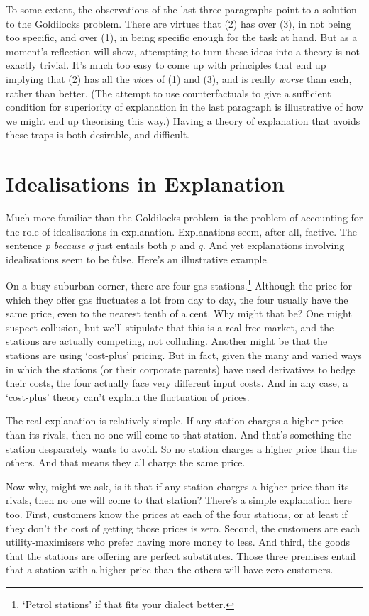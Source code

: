 To some extent, the observations of the last three paragraphs point to a solution to the Goldilocks problem. There are virtues that (2) has over (3), in not being too specific, and over (1), in being specific enough for the task at hand. But as a moment's reflection will show, attempting to turn these ideas into a theory is not exactly trivial. It's much too easy to come up with principles that end up implying that (2) has all the \textit{vices} of (1) and (3), and is really \textit{worse} than each, rather than better. (The attempt to use counterfactuals to give a sufficient condition for superiority of explanation in the last paragraph is illustrative of how we might end up theorising this way.) Having a theory of explanation that avoids these traps is both desirable, and difficult.

\section{Idealisations in Explanation}

Much more familiar than the Goldilocks problem\ is the problem of accounting for the role of idealisations in explanation. Explanations seem, after all, factive. The sentence \textit{p because q} just entails both $p$ and $q$. And yet explanations involving idealisations seem to be false. Here's an illustrative example.

On a busy suburban corner, there are four gas stations.\footnote{`Petrol stations' if that fits your dialect better.} Although the price for which they offer gas fluctuates a lot from day to day, the four usually have the same price, even to the nearest tenth of a cent. Why might that be? One might suspect collusion, but we'll stipulate that this is a real free market, and the stations are actually competing, not colluding. Another might be that the stations are using `cost-plus' pricing. But in fact, given the many and varied ways in which the stations (or their corporate parents) have used derivatives to hedge their costs, the four actually face very different input costs. And in any case, a `cost-plus' theory can't explain the fluctuation of prices.

The real explanation is relatively simple. If any station charges a higher price than its rivals, then no one will come to that station. And that's something the station desparately wants to avoid. So no station charges a higher price than the others. And that means they all charge the same price.

Now why, might we ask, is it that if any station charges a higher price than its rivals, then no one will come to that station? There's a simple explanation here too. First, customers know the prices at each of the four stations, or at least if they don't the cost of getting those prices is zero. Second, the customers are each utility-maximisers who prefer having more money to less. And third, the goods that the stations are offering are perfect substitutes. Those three premises entail that a station with a higher price than the others will have zero customers.

